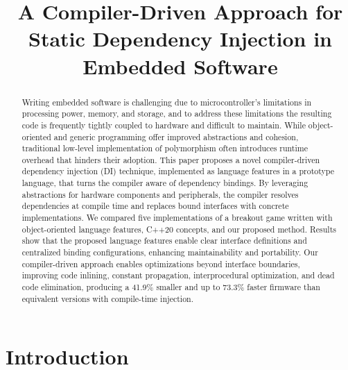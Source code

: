 \documentclass[10pt,sigplan,screen,anonymous]{acmart}
\begin{document}
\title{A Compiler-Driven Approach for Static Dependency Injection in Embedded Software}


\begin{abstract}
Writing embedded software is challenging due to microcontroller's limitations in processing power, memory, and storage, and to address these limitations the resulting code is frequently tightly coupled to hardware and difficult to maintain. While object-oriented and generic programming offer improved abstractions and cohesion, traditional low-level implementation of polymorphism often introduces runtime overhead that hinders their adoption. This paper proposes a novel compiler-driven dependency injection (DI) technique, implemented as language features in a prototype language, that turns the compiler aware of dependency bindings. By leveraging abstractions for hardware components and peripherals, the compiler resolves dependencies at compile time and replaces bound interfaces with concrete implementations. We compared five implementations of a breakout game written with object-oriented language features, C++20 concepts, and our proposed method. Results show that the proposed language features enable clear interface definitions and centralized binding configurations, enhancing maintainability and portability. Our compiler-driven approach enables optimizations beyond interface boundaries, improving code inlining, constant propagation, interprocedural optimization, and dead code elimination, producing a 41.9\% smaller and up to 73.3\% faster firmware than equivalent versions with compile-time injection.
\end{abstract}


\maketitle

\section{Introduction}
\end{document}
